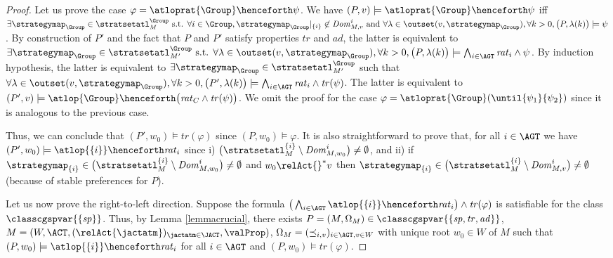 \begin{proof}
Let us prove the case 
$\varphi= \atloprat{\Group}
\henceforth  \psi  $.
We have 
$(P ,v )\models \atloprat{\Group}
\henceforth \psi $ 
iff 
$\exists \strategymap_\Group \in  \stratsetatl^\Group_{M }
  \text{ s.t. }   \forall i \in \Group, \strategymap_\Group|_{\{i\}}\not \in 
  \mathit{Dom}_{M,v}^i \text{ and }
  \forall \lambda \in \outset(v, \strategymap_\Group), \allowbreak
 \forall k > 0, \big( P, \lambda(k)  \big)\models \psi   $.
By construction of $P'$ and the fact that
$P$
and $P'$
satisfy  properties $\mathit{tr}$ and $\mathit{ad }$,
the latter is equivalent to $\exists \strategymap_\Group \in  \stratsetatl^\Group_{M' } 
  \text{ s.t. }   
  \forall \lambda \in \outset(v, \strategymap_\Group),
 \forall k > 0, \big( P, \lambda(k)  \big)\models
 \bigwedge_{i \in \AGT }\mathit{rat}_i \wedge 
 \psi  $. 
By induction hypothesis,
the latter is equivalent to 
$\exists \strategymap_\Group \in  \stratsetatl^\Group_{M' }$ 
  such that 
$  \forall \lambda \in \outset(v, \strategymap_\Group),
 \forall k > 0, \big( P' , \lambda(k)  \big)\models
 \bigwedge_{i \in \AGT }\mathit{rat}_i \wedge 
\mathit{tr}(\psi)  $. 
The latter is equivalent to
$(P',v )\models \atlop{\Group}
\henceforth \big(\mathit{rat}_C \wedge \mathit{tr}(\psi)  \big)  $.
We omit the proof for the case 
$\varphi= \atloprat{\Group}
(\until{\psi_1}{\psi_2 } ) $
since it is analogous to the previous case. 

Thus, we can conclude that $(P',w_0 )\models \mathit{tr}( \varphi )$
since 
$(P,w_0 )\models  \varphi  $.
It  is also straightforward to prove that,
      for all  $i\in \AGT$
      we have 
$(P',w_0 )\models \atlop{ \{i \}} \henceforth  
      \mathit{rat}_i$
      since
      i)      
      $  \big( \stratsetatl^{\{i\}}_{M} 
     \setminus \mathit{Dom}_{M,w_0}^i
     \big) \neq \emptyset $, 
     and ii) 
     if 
         $ \strategymap_{\{i\}} \in  \big( \stratsetatl^{\{i\}}_{M} 
     \setminus \mathit{Dom}_{M,w_0 }^i
     \big) \neq \emptyset $
     and $w_0 \relAct{ }^* v$
     then   $ \strategymap_{\{i\}} \in  \big( \stratsetatl^{\{i\}}_{M} 
     \setminus \mathit{Dom}_{M,v}^i
     \big) \neq \emptyset $
     (because of stable preferences for $P$). 

  
  

Let us now prove the right-to-left direction.
Suppose the formula $\big( \bigwedge_{i \in \AGT }
     \atlop{ \{i \}} \henceforth  
      \mathit{rat}_i \big)  \wedge
     \mathit{tr}(\varphi) $
     is satisfiable for the class
          $\classcgspvar{\{\mathit{sp} \}}$. 
          Thus, 
by Lemma 
\ref{lemmacrucial},  there exists  $P=(M,\Omega_M) \in
\classcgspvar{\{ \mathit{sp},\mathit{tr},\mathit{ad}  \}} $,
 $M = ( W,  \ACT,  (\relAct{\jactatm}   )_{\jactatm \in \JACT}, 
  \valProp  )$, $\Omega_{M }=(\preceq_{i,v }   )_{i \in \AGT, v \in W }$
  with  unique root $w_0\in W$ of $M$
such that   $(P,w_0 )\models \atlop{ \{i \}} \henceforth  
      \mathit{rat}_i$
      for all $i\in \AGT$  and 
$(P,w_0 )\models \mathit{tr}(\varphi) $. 


\end{proof}
